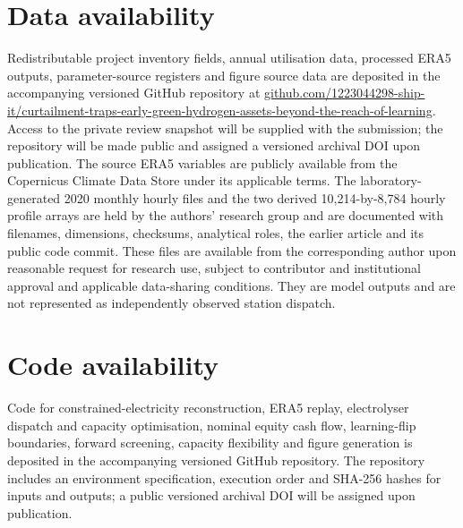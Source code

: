 \documentclass[pdflatex,sn-nature]{sn-jnl}
\begin{document}
\section*{Data availability}

Redistributable project inventory fields, annual utilisation data, processed ERA5 outputs, parameter-source registers and figure source data are deposited in the accompanying versioned GitHub repository at \href{https://github.com/1223044298-ship-it/curtailment-traps-early-green-hydrogen-assets-beyond-the-reach-of-learning}{github.com/1223044298-ship-it/curtailment-traps-early-green-hydrogen-assets-beyond-the-reach-of-learning}. Access to the private review snapshot will be supplied with the submission; the repository will be made public and assigned a versioned archival DOI upon publication. The source ERA5 variables are publicly available from the Copernicus Climate Data Store under its applicable terms. The laboratory-generated 2020 monthly hourly files and the two derived 10,214-by-8,784 hourly profile arrays are held by the authors' research group and are documented with filenames, dimensions, checksums, analytical roles, the earlier article and its public code commit. These files are available from the corresponding author upon reasonable request for research use, subject to contributor and institutional approval and applicable data-sharing conditions. They are model outputs and are not represented as independently observed station dispatch.

\section*{Code availability}

Code for constrained-electricity reconstruction, ERA5 replay, electrolyser dispatch and capacity optimisation, nominal equity cash flow, learning-flip boundaries, forward screening, capacity flexibility and figure generation is deposited in the accompanying versioned GitHub repository. The repository includes an environment specification, execution order and SHA-256 hashes for inputs and outputs; a public versioned archival DOI will be assigned upon publication.
\end{document}
